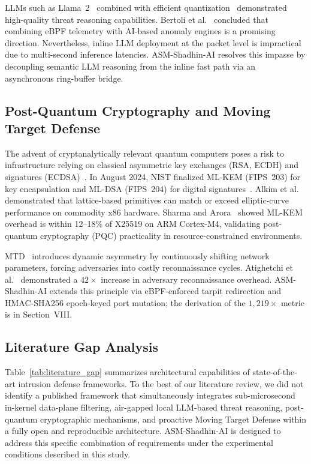 \documentclass[journal]{IEEEtran}
\renewcommand{\_}{\textunderscore\allowbreak}
\begin{document}
LLMs such as Llama~2~\cite{touvron2023llama} combined with efficient
quantization~\cite{dettmers2023qlora} demonstrated high-quality threat reasoning
capabilities. Bertoli et al.~\cite{bertoli2023ebpf} concluded that combining eBPF
telemetry with AI-based anomaly engines is a promising direction. Nevertheless,
inline LLM deployment at the packet level is impractical due to multi-second
inference latencies. ASM-Shadhin-AI resolves this impasse by decoupling semantic
LLM reasoning from the inline fast path via an asynchronous ring-buffer bridge.

\subsection{Post-Quantum Cryptography and Moving Target Defense}
The advent of cryptanalytically relevant quantum computers poses a risk to
infrastructure relying on classical asymmetric key exchanges (RSA, ECDH) and
signatures (ECDSA)~\cite{bernstein2017post,nist2024mlkem}. In August 2024, NIST
finalized ML-KEM (FIPS~203) for key encapsulation and ML-DSA (FIPS~204) for
digital signatures~\cite{nist2024mlkem,nist2024mldsa}. Alkim et
al.~\cite{alkim2016post} demonstrated that lattice-based primitives can match or
exceed elliptic-curve performance on commodity x86 hardware. Sharma and
Arora~\cite{sharma2023evaluating} showed ML-KEM overhead is within 12--18\% of
X25519 on ARM Cortex-M4, validating post-quantum cryptography (PQC) practicality
in resource-constrained environments.

MTD~\cite{jajodia2011moving,zheng2022moving} introduces dynamic asymmetry by
continuously shifting network parameters, forcing adversaries into costly
reconnaissance cycles. Atighetchi et al.~\cite{atighetchi2003adaptive} demonstrated
a $42\times$ increase in adversary reconnaissance overhead. ASM-Shadhin-AI extends
this principle via eBPF-enforced tarpit redirection and HMAC-SHA256 epoch-keyed
port mutation; the derivation of the $1{,}219\times$ metric is in Section~VIII.

\subsection{Literature Gap Analysis}
Table~\ref{tab:literature_gap} summarizes architectural capabilities of
state-of-the-art intrusion defense frameworks. To the best of our literature
review, we did not identify a published framework that simultaneously integrates
sub-microsecond in-kernel data-plane filtering, air-gapped local LLM-based threat
reasoning, post-quantum cryptographic mechanisms, and proactive Moving Target
Defense within a fully open and reproducible architecture. ASM-Shadhin-AI is
designed to address this specific combination of requirements under the
experimental conditions described in this study.
\end{document}
